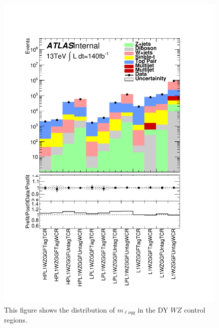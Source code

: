 \begin{figure}[h!]
  \centering
  \includegraphics[width=\hsize]{figures/results/HVTWZ/PlotyieldTable_postfit.pdf}
 \caption{This figure shows the distribution of $m_{\ell\nu qq}$ in the DY $WZ$ control regions.} 
  \label{fig:hvtwz_cr_postfit}
\end{figure} 
\FloatBarrier

